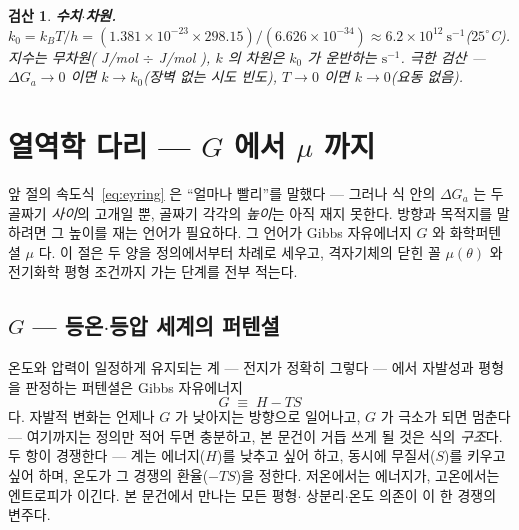 \documentclass[11pt,a4paper]{article}
\newtheorem*{verifybox}{검산}
\begin{document}
\begin{verifybox}
\textbf{수치$\cdot$차원.} $k_0=k_BT/h=(1.381\times10^{-23}\times298.15)/(6.626\times10^{-34})
\approx6.2\times10^{12}\ \mathrm{s^{-1}}$($25^\circ$C). 지수는 무차원( J/mol $\div$ J/mol ), $k$ 의
차원은 $k_0$ 가 운반하는 $\mathrm{s^{-1}}$. 극한 검산 — $\Delta G_a\to0$ 이면 $k\to k_0$(장벽 없는
시도 빈도), $T\to0$ 이면 $k\to0$(요동 없음).
\end{verifybox}

\section{열역학 다리 — $G$ 에서 $\mu$ 까지}\label{sec:thermo}
앞 절의 속도식~\eqref{eq:eyring} 은 ``얼마나 빨리''를 말했다 — 그러나 식 안의 $\Delta G_a$ 는
두 골짜기 \emph{사이}의 고개일 뿐, 골짜기 각각의 \emph{높이}는 아직 재지 못한다. 방향과 목적지를
말하려면 그 높이를 재는 언어가 필요하다. 그 언어가 Gibbs 자유에너지 $G$ 와 화학퍼텐셜 $\mu$ 다. 이 절은 두 양을 정의에서부터 차례로
세우고, 격자기체의 닫힌 꼴 $\mu(\theta)$ 와 전기화학 평형 조건까지 가는 단계를 전부 적는다.

\subsection{$G$ — 등온$\cdot$등압 세계의 퍼텐셜}
온도와 압력이 일정하게 유지되는 계 — 전지가 정확히 그렇다 — 에서 자발성과 평형을 판정하는 퍼텐셜은
Gibbs 자유에너지
\begin{equation}
G\;\equiv\;H-TS
\label{eq:gibbsdef}
\end{equation}
다. 자발적 변화는 언제나 $G$ 가 낮아지는 방향으로 일어나고, $G$ 가 극소가 되면 멈춘다 — 여기까지는
정의만 적어 두면 충분하고, 본 문건이 거듭 쓰게 될 것은 식의 \emph{구조}다. 두 항이 경쟁한다 — 계는
에너지($H$)를 낮추고 싶어 하고, 동시에 무질서($S$)를 키우고 싶어 하며, 온도가 그 경쟁의
환율($-TS$)을 정한다. 저온에서는 에너지가, 고온에서는 엔트로피가 이긴다. 본 문건에서 만나는 모든 평형$\cdot$
상분리$\cdot$온도 의존이 이 한 경쟁의 변주다.
\end{document}
